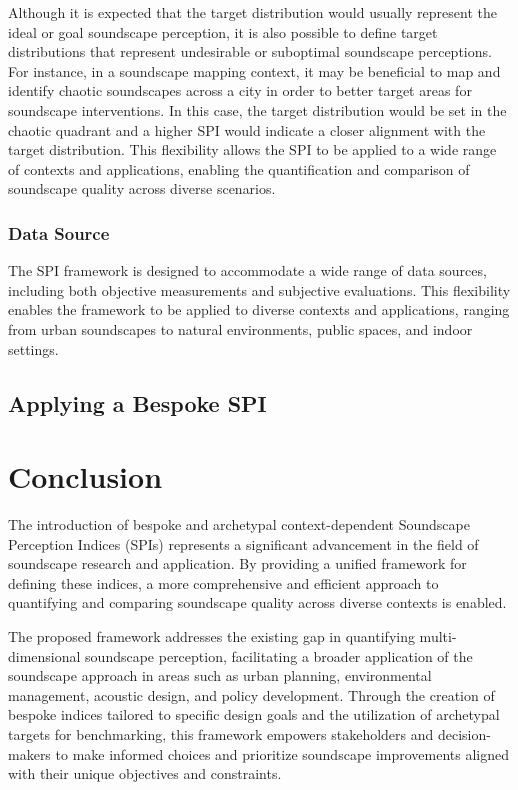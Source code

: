 \documentclass[
  authoryear,
  preprint,
  3p]{elsarticle}
\begin{document}
Although it is expected that the target distribution would usually
represent the ideal or goal soundscape perception, it is also possible
to define target distributions that represent undesirable or suboptimal
soundscape perceptions. For instance, in a soundscape mapping context,
it may be beneficial to map and identify chaotic soundscapes across a
city in order to better target areas for soundscape interventions. In
this case, the target distribution would be set in the chaotic quadrant
and a higher SPI would indicate a closer alignment with the target
distribution. This flexibility allows the SPI to be applied to a wide
range of contexts and applications, enabling the quantification and
comparison of soundscape quality across diverse scenarios.

\subsubsection{Data Source}\label{data-source}

The SPI framework is designed to accommodate a wide range of data
sources, including both objective measurements and subjective
evaluations. This flexibility enables the framework to be applied to
diverse contexts and applications, ranging from urban soundscapes to
natural environments, public spaces, and indoor settings.

\subsection{Applying a Bespoke SPI}\label{applying-a-bespoke-spi}

\section{Conclusion}\label{conclusion}

The introduction of bespoke and archetypal context-dependent Soundscape
Perception Indices (SPIs) represents a significant advancement in the
field of soundscape research and application. By providing a unified
framework for defining these indices, a more comprehensive and efficient
approach to quantifying and comparing soundscape quality across diverse
contexts is enabled.

The proposed framework addresses the existing gap in quantifying
multi-dimensional soundscape perception, facilitating a broader
application of the soundscape approach in areas such as urban planning,
environmental management, acoustic design, and policy development.
Through the creation of bespoke indices tailored to specific design
goals and the utilization of archetypal targets for benchmarking, this
framework empowers stakeholders and decision-makers to make informed
choices and prioritize soundscape improvements aligned with their unique
objectives and constraints.
\end{document}
